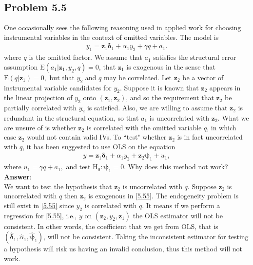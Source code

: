 \documentclass[10pt]{article}
\newcommand{\E}{\text{E}}
\begin{document}
\subsection*{Problem 5.5}
One occasionally sees the following reasoning used in applied work for choosing instrumental variables in the context of omitted variables. The model is
\begin{align*}
    y_1=\textbf{z}_1\pmb{\delta}_1+\alpha_1y_2+\gamma q+a_1.
\end{align*}
where $q$ is the omitted factor. We assume that $a_1$ satisfies the structural error assumption $\E(a_1|\textbf{z}_1,y_2,q)=0$, that $\textbf{z}_1$ is exogenous in the sense that $\E(q|\textbf{z}_1)=0,$ but that $y_2$ and $q$ may be correlated. Let $\textbf{z}_2$ be a vector of instrumental variable candidates for $y_2$. Suppose it is known that $\textbf{z}_2$ appears in the linear projection of $y_2$ onto $(\textbf{z}_1,\textbf{z}_2)$, and so the requirement that $\textbf{z}_2$ be partially correlated with $y_2$ is satisfied. Also, we are willing to assume that $\textbf{z}_2$ is redundant in the structural equation, so that $a_1$ is uncorrelated with $\textbf{z}_2$. What we are unsure of is whether $\textbf{z}_2$ is correlated with the omitted variable $q$, in which case $\textbf{z}_2$ would not contain valid IVs.
To ``test" whether $\textbf{z}_2$ is in fact uncorrelated with $q$, it has been suggested to use OLS on the equation
\begin{align}
    y=\textbf{z}_1\pmb{\delta}_1+\alpha_1y_2+\textbf{z}_2\pmb{\psi}_1+u_1, \tag{5.55}\label{5.55}
\end{align}
where $u_1=\gamma q+a_1,$ and test $\text{H}_0:\pmb{\psi}_1=0.$ Why does this method not work?
\\ \textbf{Answer}:\\
We want to test the hypothesis that $\textbf{z}_2$ is uncorrelated with $q$. Suppose $\textbf{z}_2$ is uncorrelated with $q$ then $\textbf{z}_2$ is exogenous in \eqref{5.55}. The endogeneity problem is still exist in \eqref{5.55} since $y_2$ is correlated with $q$. It means if we perform a regression for \eqref{5.55}, i.e., $y$ on  $(\textbf{z}_2,y_2,\textbf{z}_1)$ the OLS estimator will not be consistent. In other words, the coefficient that we get from OLS, that is $(\hat{\pmb{\delta}}_1,\hat{\alpha}_1,\hat{\pmb{\psi}}_1)$, will not be consistent. Taking the inconsistent estimator for testing a hypothesis will risk us having an invalid conclusion, thus this method will not work.
\end{document}
